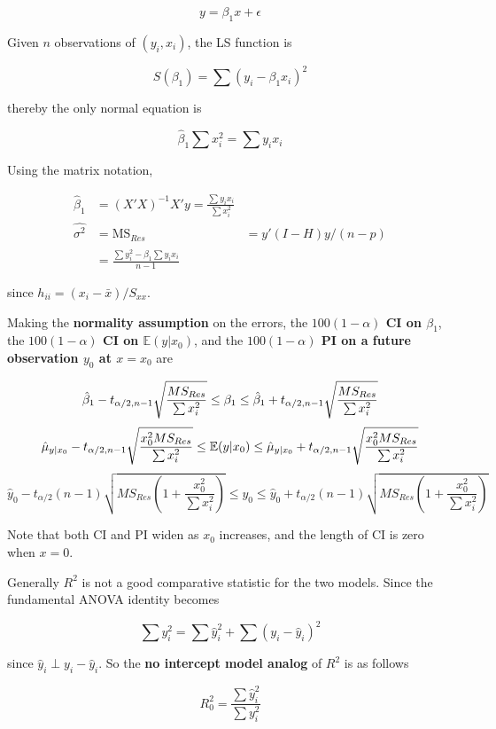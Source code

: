 \documentclass[12pt]{article}
\begin{document}
$$
y = \beta_1 x + \epsilon
$$

Given $n$ observations of $(y_i, x_i)$, the LS function is 

$$
S(\beta_1) = \sum (y_i - \beta_1 x_i)^2
$$

thereby the only normal equation is 

$$
\hat{\beta}_1 \sum x_i^2 = \sum y_i x_i
$$

Using the matrix notation, 

$$
\begin{aligned}
\hat{\beta}_1 &= (X'X)^{-1}X'y = \frac{\sum y_i x_i}{\sum x_i^2} \\[10pt]
\hat{\sigma^2} &= \mathrm{MS}_{Res} &= y' (I-H) y / (n-p) \\[10pt]
&= \frac{\sum y_i^2 - \hat{\beta}_1 \sum y_i x_i}{n-1}
\end{aligned}
$$

since $h_{ii} = (x_i - \bar{x})/S_{xx}$.


Making the \textbf{normality assumption} on the errors, the \textbf{$100(1-\alpha)$ CI on $\beta_1$}, the \textbf{$100(1-\alpha)$ CI on $\mathbb{E}(y|x_0)$}, and the \textbf{$100(1-\alpha)$ PI on a future observation $y_0$ at $x=x_0$} are 

$$
\hat{\beta}_1 - t_{\alpha/2, n-1} \sqrt{ \frac{MS_{Res}}{\sum x_i^2}  } \le \beta_1 \le \hat{\beta}_1 + t_{\alpha/2, n-1} \sqrt{ \frac{MS_{Res}}{\sum x_i^2}  } \\[10pt]
$$
$$
\hat{\mu}_{y|x_0} - t_{\alpha/2, n-1} \sqrt{\frac{x_0^2 MS_{Res}}{\sum x_i^2}   } \le \mathbb{E} (y|x_0) \le \hat{\mu}_{y|x_0} + t_{\alpha/2, n-1} \sqrt{\frac{x_0^2 MS_{Res}}{\sum x_i^2}   }  \\[10pt]
$$
$$
\hat{y}_0 - t_{\alpha/2}(n-1) \sqrt{ MS_{Res}\left( 1 + \frac{x_0^2}{\sum x_i^2} \right)} \le y_0 \le \hat{y}_0 + t_{\alpha/2}(n-1) \sqrt{ MS_{Res}\left( 1 + \frac{x_0^2}{\sum x_i^2} \right)} 
$$

Note that both CI and PI widen as $x_0$ increases, and the length of CI is zero when $x=0$.

Generally $R^2$ is not a good comparative statistic for the two models. Since the fundamental ANOVA identity becomes

$$
\sum y_i^2 = \sum \hat{y}_i^2 + \sum (y_i - \hat{y}_i)^2
$$

since $\hat{y}_i \perp y_i - \hat{y}_i$. So the \textbf{no intercept model analog} of $R^2$ is as follows

$$
R_0^2 = \frac{\sum \hat{y}_i^2 }{ \sum y_i^2}
$$
\end{document}
